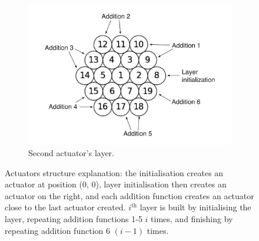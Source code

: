 \begin{figure}[h]
\begin{center}
	\begin{subfigure}{0.70\textwidth}
	\includegraphics[width=\textwidth]{circles/layer_2}
	\caption{Second actuator's layer.}
	\label{fig:appendix:sloan_structure:layer_2}
	\end{subfigure}
	\caption{Actuators structure explanation: the initialisation creates an actuator at position (0, 0), layer initialisation then creates an actuator on the right, and each addition function creates an actuator close to the last actuator created. $i^{\textrm{th}}$ layer is built by initialising the layer, repeating addition functions 1-5 $i$ times, and finishing by repeating addition function 6 $(i-1)$ times.}
	\label{fig:appendix:sloan_structure}
\end{center}
\end{figure}


